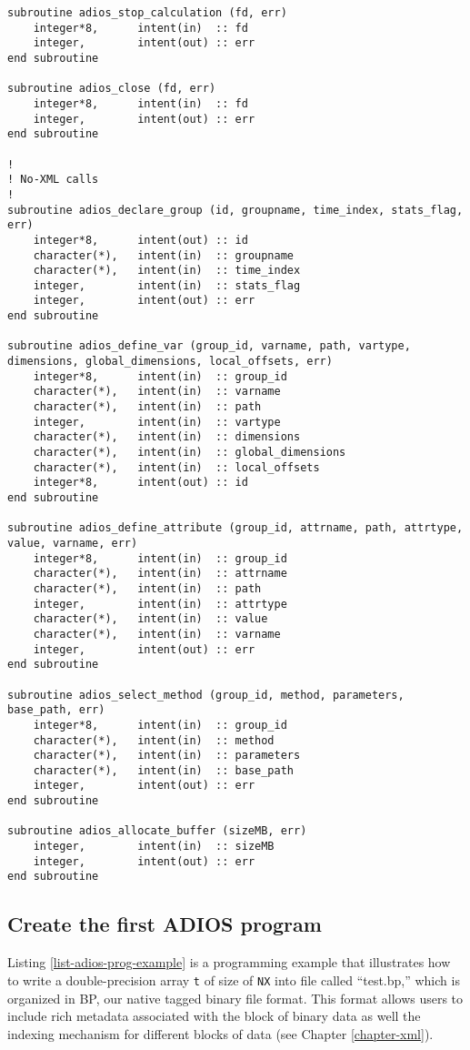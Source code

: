 \begin{lstlisting}[language=ADIOS,alsolanguage=Fortran]
subroutine adios_stop_calculation (fd, err)
    integer*8,      intent(in)  :: fd
    integer,        intent(out) :: err
end subroutine

subroutine adios_close (fd, err)
    integer*8,      intent(in)  :: fd
    integer,        intent(out) :: err
end subroutine

!
! No-XML calls
!
subroutine adios_declare_group (id, groupname, time_index, stats_flag, err)
    integer*8,      intent(out) :: id
    character(*),   intent(in)  :: groupname
    character(*),   intent(in)  :: time_index
    integer,        intent(in)  :: stats_flag
    integer,        intent(out) :: err
end subroutine

subroutine adios_define_var (group_id, varname, path, vartype, dimensions, global_dimensions, local_offsets, err)
    integer*8,      intent(in)  :: group_id
    character(*),   intent(in)  :: varname
    character(*),   intent(in)  :: path
    integer,        intent(in)  :: vartype
    character(*),   intent(in)  :: dimensions
    character(*),   intent(in)  :: global_dimensions
    character(*),   intent(in)  :: local_offsets
    integer*8,      intent(out) :: id
end subroutine

subroutine adios_define_attribute (group_id, attrname, path, attrtype, value, varname, err)
    integer*8,      intent(in)  :: group_id
    character(*),   intent(in)  :: attrname
    character(*),   intent(in)  :: path
    integer,        intent(in)  :: attrtype
    character(*),   intent(in)  :: value
    character(*),   intent(in)  :: varname
    integer,        intent(out) :: err
end subroutine

subroutine adios_select_method (group_id, method, parameters, base_path, err)
    integer*8,      intent(in)  :: group_id
    character(*),   intent(in)  :: method
    character(*),   intent(in)  :: parameters
    character(*),   intent(in)  :: base_path
    integer,        intent(out) :: err
end subroutine

subroutine adios_allocate_buffer (sizeMB, err)
    integer,        intent(in)  :: sizeMB
    integer,        intent(out) :: err
end subroutine
\end{lstlisting}

\subsection{Create the first ADIOS program}

Listing \ref{list-adios-prog-example} is a programming example that illustrates 
how to write a double-precision 
array \verb+t+ of size of \verb+NX+ into file called ``test.bp,'' 
which is organized in BP, our native tagged binary file format. This format allows 
users to include rich metadata associated with the block of binary data as well 
the indexing mechanism for different blocks of data (see Chapter \ref{chapter-xml}). 

